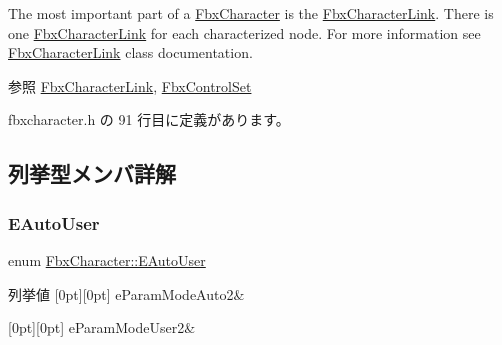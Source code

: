 The most important part of a \hyperlink{class_fbx_character}{Fbx\+Character} is the \hyperlink{class_fbx_character_link}{Fbx\+Character\+Link}. There is one \hyperlink{class_fbx_character_link}{Fbx\+Character\+Link} for each characterized node. For more information see \hyperlink{class_fbx_character_link}{Fbx\+Character\+Link} class documentation.

\begin{DoxySeeAlso}{参照}
\hyperlink{class_fbx_character_link}{Fbx\+Character\+Link}, \hyperlink{class_fbx_control_set}{Fbx\+Control\+Set} 
\end{DoxySeeAlso}


 fbxcharacter.\+h の 91 行目に定義があります。



\subsection{列挙型メンバ詳解}
\mbox{\label{class_fbx_character_a5b03462709a82a15d89ee4563a4c49df}} 
\subsubsection{\texorpdfstring{E\+Auto\+User}{EAutoUser}}
{\footnotesize\ttfamily enum \hyperlink{class_fbx_character_a5b03462709a82a15d89ee4563a4c49df}{Fbx\+Character\+::\+E\+Auto\+User}}

\begin{DoxyEnumFields}{列挙値}
[0pt][0pt]{}\mbox{\label{class_fbx_character_a5b03462709a82a15d89ee4563a4c49dfaf79e904c4e50228fe6957393e7b11ad0}} 
e\+Param\+Mode\+Auto2&\\
\hline

[0pt][0pt]{}\mbox{\label{class_fbx_character_a5b03462709a82a15d89ee4563a4c49dfafbee83ba327243c6f52fbb08264b9fb4}} 
e\+Param\+Mode\+User2&\\
\hline

\end{DoxyEnumFields}



